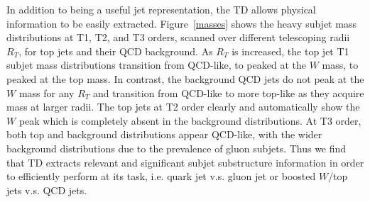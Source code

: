 \documentclass[notoc,preprintnumbers]{JHEP3}
\begin{document}
In addition to being a useful jet representation, the TD allows physical information to be easily extracted. Figure~\ref{masses} shows the heavy subjet mass \cite{Chien:2010kc} distributions at T1, T2, and T3 orders, scanned over different telescoping radii $R_T$, for top jets and their QCD background. As $R_T$ is increased, the top jet T1 subjet mass distributions transition from QCD-like, to peaked at the $W$ mass, to peaked at the top mass. In contrast, the background QCD jets do not peak at the $W$ mass for any $R_T$ and transition from QCD-like to more top-like as they acquire mass at larger radii. The top jets at T2 order clearly and automatically show the $W$ peak which is completely absent in the background distributions. At T3 order, both top and background distributions appear QCD-like, with the wider background distributions due to the prevalence of gluon subjets. Thus we find that TD extracts relevant and significant subjet substructure information in order to efficiently perform at its task, i.e. quark jet v.s. gluon jet or boosted $W$/top jets v.s. QCD jets.



\end{document}
